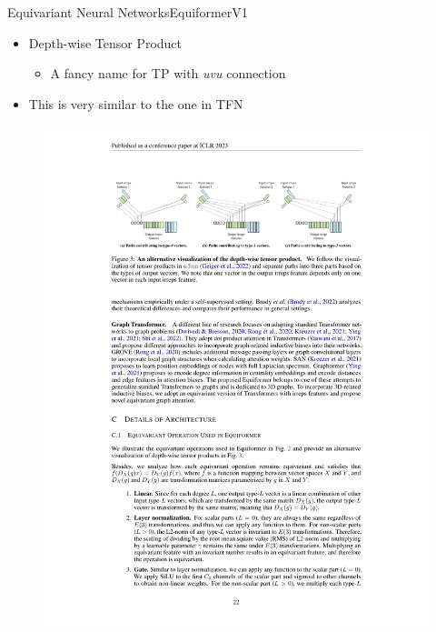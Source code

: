 \documentclass[pdf,serif]{beamer}
\newcommand{\empr}[1]{{\color{BerkeleyBlue}\emph{#1}}}
\begin{document}
\begin{frame}{Equivariant Neural Networks}{EquiformerV1}
    \begin{itemize}
        \item Depth-wise Tensor Product
        \begin{itemize}
            \item A fancy name for TP with \empr{uvu} connection
        \end{itemize}
        \item This is very similar to the one in TFN
    \end{itemize}
    \vspace*{1em}
    \begin{figure}
        \includegraphics[width=\linewidth]{images/DTP}
    \end{figure}
\end{frame}
\end{document}
